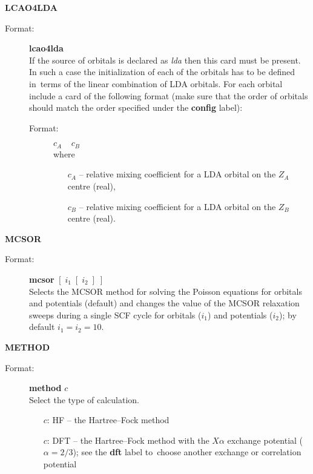 \documentclass[12pt,a4paper]{article}
\newcommand{\fb}[1]{\textbf{#1}}
\begin{document}
\begin{description}
\begin{description}
\begin{description}
\end{description}
\end{description}


\item \textbf{LCAO4LDA}
\begin{description}
\item[Format:] \textbf{lcao4lda} \\ If the source of orbitals is declared as
  \textsl{lda} then this card must be present. In such a case the initialization of
  each of the orbitals has to be defined in~terms of the linear combination of LDA
  orbitals. For each orbital include a card of the following format
  (make sure that the order of orbitals should match the order specified under the
  \textbf{config} label):

\begin{description}
\item[Format:] $c_A \;\;\;\;c_B$ \\
where
\begin{itemize}
\item[] $c_A$ -- relative mixing coefficient for a LDA orbital on the
                    $Z_A$ centre (real),
\item[] $c_B$  -- relative mixing coefficient for a LDA orbital on the
  $Z_B$ centre (real).
\end{itemize}  
\end{description}
\end{description}


\item \textbf{MCSOR}
\begin{description}
\item[Format:] \textbf{mcsor} $[\;i_1\;[\;i_2\;]\;]$\\
Selects the MCSOR method for solving the Poisson equations for orbitals and potentials
(default) and changes the value of the MCSOR relaxation sweeps during a single SCF
cycle for orbitals ($i_1$) and potentials ($i_2$); by default $i_1=i_2=10$.
\end{description}

\item \textbf{METHOD}
\begin{description}
\item[Format:] \textbf{method} $c$\\
Select the type of calculation.
\begin{itemize}
\item[$c$:] HF -- the Hartree--Fock method
\item[$c$:] DFT -- the Hartree--Fock method with the $X\alpha$ exchange
  potential ($\alpha=2/3$); see the \fb{dft} label to~choose
  another exchange or correlation potential


\end{itemize}
\end{description}
\end{description}
\end{document}
